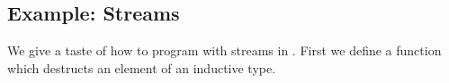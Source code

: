 \subsection{Example: Streams}
We give a taste of how to program with streams in \GTT.
First we define a function  which destructs an element of an inductive type.
\begin{code}%
\>[0]\AgdaSpace{}%
\AgdaSymbol{:}\AgdaSpace{}%
\AgdaSpace{}%
\AgdaSymbol{\{}\AgdaSymbol{\}}\AgdaSpace{}%
\AgdaSymbol{\{}\AgdaSpace{}%
\AgdaSymbol{:}\AgdaSpace{}%
\AgdaSpace{}%
\AgdaSymbol{\}}\AgdaSpace{}%
\AgdaSymbol{\{}\AgdaSpace{}%
\AgdaSymbol{:}\AgdaSpace{}%
\AgdaSpace{}%
\AgdaSymbol{\}}\AgdaSpace{}%
\AgdaSpace{}%
\AgdaSpace{}%
\AgdaSpace{}%
\AgdaSymbol{(}\AgdaSpace{}%
\AgdaSymbol{)}\AgdaSpace{}%
\AgdaSpace{}%
\AgdaSpace{}%
\AgdaSpace{}%
\AgdaSymbol{(}\AgdaSpace{}%
\AgdaSpace{}%
\AgdaSymbol{(}\AgdaSpace{}%
\AgdaSymbol{))}\<%
\end{code}

